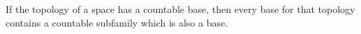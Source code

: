If the topology of a space has a countable base, then every base for that topology contains a countable subfamily which is also a base.
